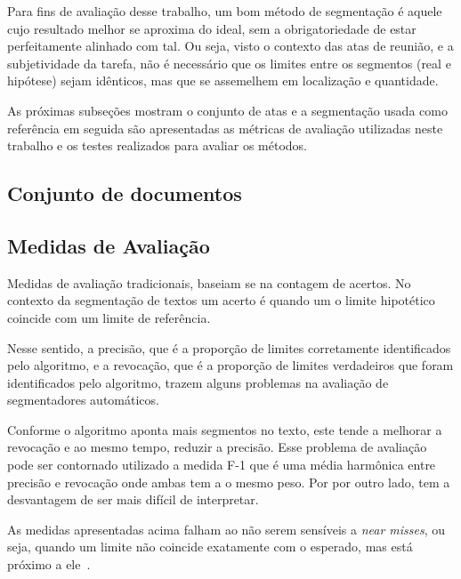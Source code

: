 Para fins de avaliação desse trabalho, um bom método de segmentação é aquele cujo resultado melhor se aproxima do ideal, sem a obrigatoriedade de estar perfeitamente alinhado com tal. Ou seja, visto o contexto das atas de reunião, e a subjetividade da tarefa, não é necessário que os limites entre os segmentos (real e hipótese) sejam idênticos, mas que se assemelhem em localização e quantidade.




As próximas subseções mostram o conjunto de atas e a segmentação usada como referência em seguida são apresentadas as métricas de avaliação utilizadas neste trabalho e os testes realizados para avaliar os métodos.


\subsection{Conjunto de documentos}
	\label{subsec:conjunto-de-documentos}
	
	


\subsection{Medidas de Avaliação}


Medidas de avaliação tradicionais, baseiam se na contagem de acertos. No contexto da segmentação de textos um acerto é quando um o limite hipotético coincide com um limite de referência.

Nesse sentido, 
%
a precisão, que é a proporção de limites corretamente identificados pelo algoritmo, e 
%
a revocação, que é a proporção de limites verdadeiros que foram identificados pelo algoritmo,
%
trazem alguns problemas na avaliação de segmentadores automáticos.
 	
	
Conforme o algoritmo aponta mais segmentos no texto, este tende a melhorar a revocação e ao mesmo tempo, reduzir a precisão. Esse problema de avaliação pode ser contornado utilizado a medida F-1 que é uma média harmônica entre precisão e revocação onde ambas tem a o mesmo peso. Por por outro lado, tem a desvantagem de ser mais difícil de interpretar. 

As medidas apresentadas acima falham ao não serem sensíveis a \textit{near misses}, ou seja, quando um limite não coincide exatamente com o esperado, mas está próximo a ele~\cite{Kern2009}.

